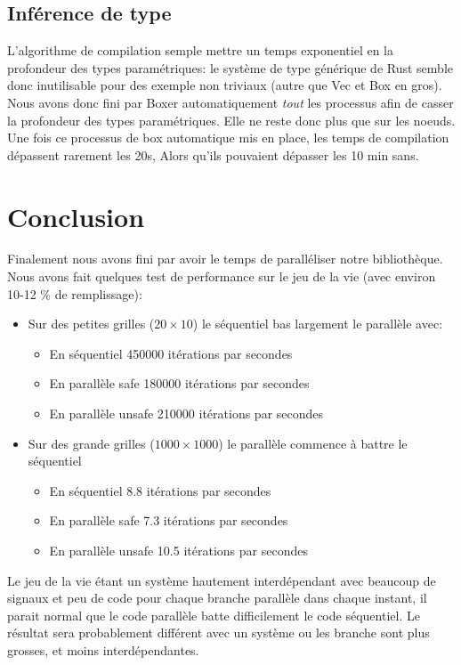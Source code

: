 \documentclass[a4paper]{article}
\renewcommand{\(}{\left(}
\renewcommand{\)}{\right)}
\begin{document}
\subsection{Inférence de type}
L'algorithme de compilation semple mettre un temps exponentiel en la profondeur
des types paramétriques: le système de type générique de Rust semble donc inutilisable
pour des exemple non triviaux (autre que Vec et Box en gros). Nous avons donc
fini par Boxer automatiquement \emph{tout} les processus afin de casser la
profondeur des types paramétriques. Elle ne reste donc plus que sur les noeuds.
Une fois ce processus de box automatique mis en place, les temps de compilation
dépassent rarement les 20s, Alors qu'ils pouvaient dépasser les 10 min sans.

\section{Conclusion}
Finalement nous avons fini par avoir le temps de paralléliser notre
bibliothèque. Nous avons fait quelques test de performance sur le jeu de la vie
(avec environ 10-12 \% de remplissage):

\begin{itemize}
\item Sur des petites grilles ($20 \times 10$) le séquentiel bas largement le
  parallèle avec:
  \begin{itemize}
  \item  En séquentiel 450000 itérations par secondes
  \item  En parallèle safe 180000 itérations par secondes
  \item  En parallèle unsafe 210000 itérations par secondes
  \end{itemize}
\item Sur des grande grilles ($1000 \times 1000$) le parallèle commence à battre le séquentiel
  \begin{itemize}
  \item  En séquentiel 8.8 itérations par secondes
  \item  En parallèle safe 7.3 itérations par secondes
  \item  En parallèle unsafe 10.5 itérations par secondes
  \end{itemize}
\end{itemize}

Le jeu de la vie étant un système hautement interdépendant avec beaucoup de
signaux et peu de code pour chaque branche parallèle dans chaque instant, il
parait normal que le code parallèle batte difficilement le code séquentiel. Le
résultat sera probablement différent avec un système ou les branche sont plus
grosses, et moins interdépendantes.
\end{document}
